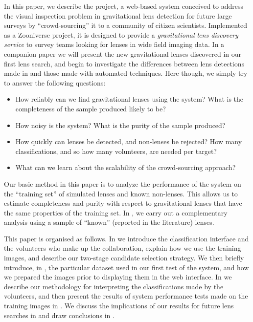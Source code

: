 \documentclass[useAMS,usenatbib,a4paper]{mn2e}
\begin{document}
In this paper, we describe the \SW project, a web-based system conceived to
address the visual inspection problem in gravitational lens detection for future
large surveys by ``crowd-sourcing'' it to a community of citizen scientists.
Implemented as a Zooniverse \citep{SimpsonEtal2014}
project, it is designed to provide a {\it gravitational lens discovery service}
to survey teams looking for lenses in wide field imaging data. In a companion
paper \citep[][hereafter \PaperTwo]{MoreEtal2015} we will present the new
gravitational lenses discovered in our first lens search, and
begin to investigate the differences between lens detections made in \SW and
those made with automated techniques. Here though, we simply try to answer the
following questions:

\begin{itemize}

\item How reliably can we find gravitational lenses using the \SW
system? What is the completeness of the sample produced likely to be?

\item How noisy is the system? What is the purity of the sample
produced?

\item How quickly can lenses be detected, and non-lenses be rejected?
How many classifications, and so how many volunteers, are needed per target?

\item What can we learn about the scalability of the crowd-sourcing approach?

\end{itemize}

Our basic method in this paper is to analyze the performance of the \SW system
on the ``training set'' of simulated lenses and known non-lenses. This allows us
to estimate completeness and purity with respect to gravitational lenses that
have the same properties of the training set. In \PaperTwo, we carry out a
complementary analysis using a sample of ``known'' (reported in the literature)
lenses.

This paper is organised as follows.  In  we introduce the \SW
classification interface and the volunteers who make up the \SW
collaboration,  explain how we use the training images, and describe our
two-stage candidate selection strategy. We then briefly introduce, in
, the particular dataset used in our first test
of the \SW system, and how we prepared the images prior to displaying them in
the web interface. In  we describe our methodology for
interpreting the classifications made by the volunteers, and then present the
results of system performance tests  made on the training images in
.  We discuss the implications of our results for future
lens searches in  and draw conclusions in
.
\end{document}
